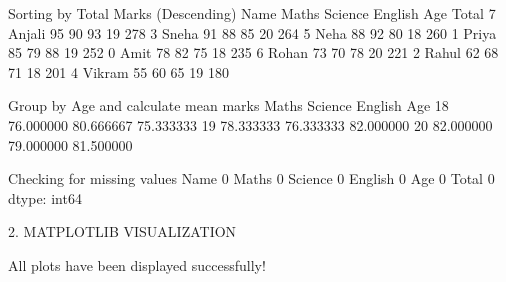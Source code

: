  Sorting by Total Marks (Descending) 
     Name  Maths  Science  English  Age  Total
7  Anjali     95       90       93   19    278
3   Sneha     91       88       85   20    264
5    Neha     88       92       80   18    260
1   Priya     85       79       88   19    252
0    Amit     78       82       75   18    235
6   Rohan     73       70       78   20    221
2   Rahul     62       68       71   18    201
4  Vikram     55       60       65   19    180

 Group by Age and calculate mean marks 
         Maths    Science    English
Age                                 
18   76.000000  80.666667  75.333333
19   78.333333  76.333333  82.000000
20   82.000000  79.000000  81.500000

 Checking for missing values 
Name       0
Maths      0
Science    0
English    0
Age        0
Total      0
dtype: int64

2. MATPLOTLIB VISUALIZATION

All plots have been displayed successfully!